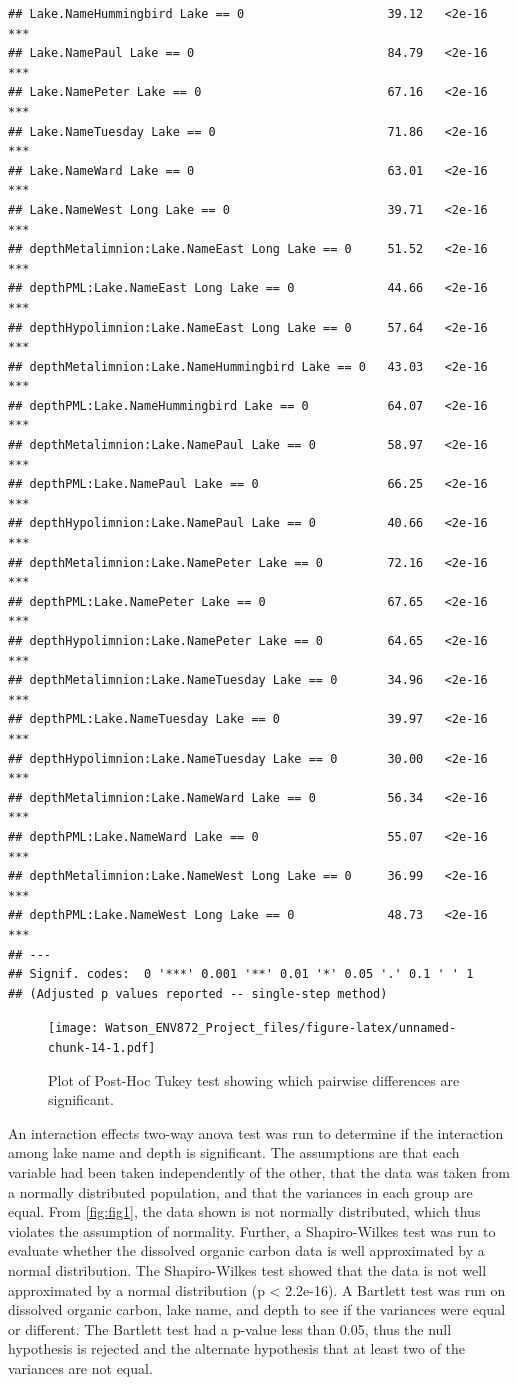 \documentclass[12pt,]{article}
\begin{document}
\begin{verbatim}
## Lake.NameHummingbird Lake == 0                    39.12   <2e-16 ***
## Lake.NamePaul Lake == 0                           84.79   <2e-16 ***
## Lake.NamePeter Lake == 0                          67.16   <2e-16 ***
## Lake.NameTuesday Lake == 0                        71.86   <2e-16 ***
## Lake.NameWard Lake == 0                           63.01   <2e-16 ***
## Lake.NameWest Long Lake == 0                      39.71   <2e-16 ***
## depthMetalimnion:Lake.NameEast Long Lake == 0     51.52   <2e-16 ***
## depthPML:Lake.NameEast Long Lake == 0             44.66   <2e-16 ***
## depthHypolimnion:Lake.NameEast Long Lake == 0     57.64   <2e-16 ***
## depthMetalimnion:Lake.NameHummingbird Lake == 0   43.03   <2e-16 ***
## depthPML:Lake.NameHummingbird Lake == 0           64.07   <2e-16 ***
## depthMetalimnion:Lake.NamePaul Lake == 0          58.97   <2e-16 ***
## depthPML:Lake.NamePaul Lake == 0                  66.25   <2e-16 ***
## depthHypolimnion:Lake.NamePaul Lake == 0          40.66   <2e-16 ***
## depthMetalimnion:Lake.NamePeter Lake == 0         72.16   <2e-16 ***
## depthPML:Lake.NamePeter Lake == 0                 67.65   <2e-16 ***
## depthHypolimnion:Lake.NamePeter Lake == 0         64.65   <2e-16 ***
## depthMetalimnion:Lake.NameTuesday Lake == 0       34.96   <2e-16 ***
## depthPML:Lake.NameTuesday Lake == 0               39.97   <2e-16 ***
## depthHypolimnion:Lake.NameTuesday Lake == 0       30.00   <2e-16 ***
## depthMetalimnion:Lake.NameWard Lake == 0          56.34   <2e-16 ***
## depthPML:Lake.NameWard Lake == 0                  55.07   <2e-16 ***
## depthMetalimnion:Lake.NameWest Long Lake == 0     36.99   <2e-16 ***
## depthPML:Lake.NameWest Long Lake == 0             48.73   <2e-16 ***
## ---
## Signif. codes:  0 '***' 0.001 '**' 0.01 '*' 0.05 '.' 0.1 ' ' 1
## (Adjusted p values reported -- single-step method)
\end{verbatim}

\begin{figure}
\centering
\texttt{[image: Watson\_ENV872\_Project\_files/figure-latex/unnamed-chunk-14-1.pdf]}
\caption{\label{fig:fig9}Plot of Post-Hoc Tukey test showing which
pairwise differences are significant.}
\end{figure}

An interaction effects two-way anova test was run to determine if the
interaction among lake name and depth is significant. The assumptions
are that each variable had been taken independently of the other, that
the data was taken from a normally distributed population, and that the
variances in each group are equal. From \autoref{fig:fig1}, the data
shown is not normally distributed, which thus violates the assumption of
normality. Further, a Shapiro-Wilkes test was run to evaluate whether
the dissolved organic carbon data is well approximated by a normal
distribution. The Shapiro-Wilkes test showed that the data is not well
approximated by a normal distribution (p \textless{} 2.2e-16). A
Bartlett test was run on dissolved organic carbon, lake name, and depth
to see if the variances were equal or different. The Bartlett test had a
p-value less than 0.05, thus the null hypothesis is rejected and the
alternate hypothesis that at least two of the variances are not equal.
\end{document}
